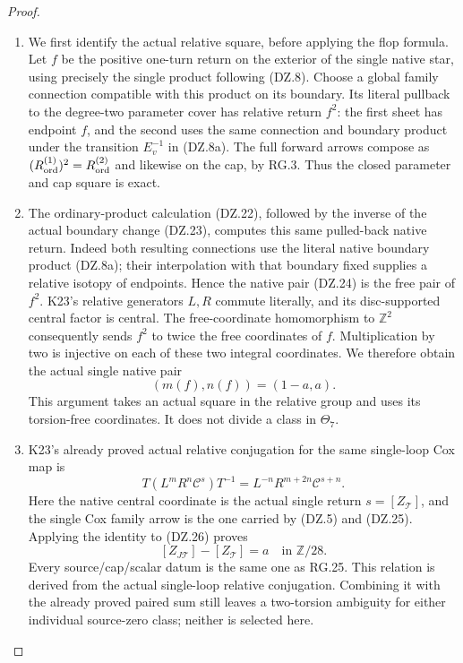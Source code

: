 \begin{proof}
\begin{enumerate}[label=\arabic*.]
\item We first identify the actual relative square, before applying the
flop formula. Let \(f\) be the positive one-turn return on the
exterior of the single native star, using precisely the single
product following (DZ.8). Choose a global family connection
compatible with this product on its boundary. Its literal pullback
to the degree-two parameter cover has relative return \(f^2\):
the first sheet has endpoint \(f\), and the second uses the same
connection and boundary product under the transition \(E_v^{-1}\)
in (DZ.8a). The full forward arrows compose as
\((R_{\rm ord}^{(1)})^2=R_{\rm ord}^{(2)}\) and likewise on the
cap, by RG.3. Thus the closed parameter and cap square is exact.

\item The ordinary-product calculation (DZ.22), followed by the inverse
of the actual boundary change (DZ.23), computes this same
pulled-back native return. Indeed both resulting connections use
the literal native boundary product (DZ.8a); their interpolation
with that boundary fixed supplies a relative isotopy of endpoints.
Hence the native pair (DZ.24) is the free pair of \(f^2\).
K23's relative generators \(L,R\) commute literally, and its
disc-supported central factor is central. The free-coordinate
homomorphism to \(\mathbb Z^2\) consequently sends
\(f^2\) to twice the free coordinates of \(f\).
Multiplication by two is injective on each of these two integral
coordinates. We therefore obtain the actual single native pair
\[
                         (m(f),n(f))=(1-a,a).       \tag{DZ.26}
\]
This argument takes an actual square in the relative group and
uses its torsion-free coordinates. It does not divide a class in
\(\Theta_7\).

\item K23's already proved actual relative conjugation for the same
single-loop Cox map is
\[
 T(L^mR^n\mathcal C^s)T^{-1}
          =L^{-n}R^{m+2n}\mathcal C^{s+n}.
\]
Here the native central coordinate is the actual single return
\(s=[Z_{\mathcal T}]\), and the single Cox family arrow is the
one carried by (DZ.5) and (DZ.25). Applying the identity to
(DZ.26) proves
\[
                 [Z_{J\mathcal T}]-[Z_{\mathcal T}]
                         =a\quad\text{in }\mathbb Z/28. \tag{DZ.27}
\]
Every source/cap/scalar datum is the same one as RG.25. This
relation is derived from the actual single-loop relative
conjugation. Combining it with the already proved paired sum
still leaves a two-torsion ambiguity for either individual
source-zero class; neither is selected here.


\end{enumerate}
\end{proof}
